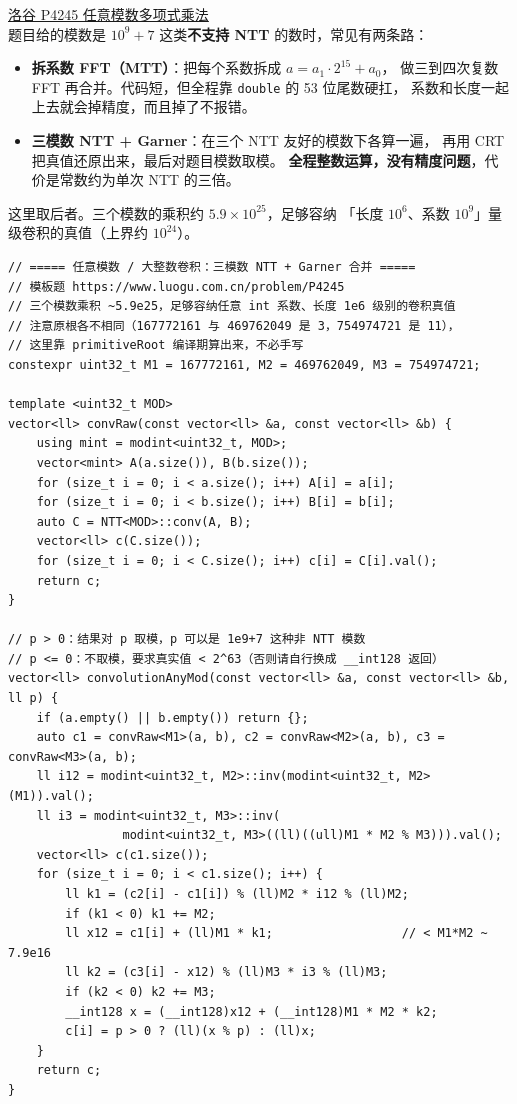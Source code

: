		\href{https://www.luogu.com.cn/problem/P4245}{洛谷 P4245 任意模数多项式乘法} \\

		题目给的模数是 $10^9+7$ 这类\textbf{不支持 NTT} 的数时，常见有两条路：

		\begin{itemize}
			\item \textbf{拆系数 FFT（MTT）}：把每个系数拆成 $a = a_1 \cdot 2^{15} + a_0$，
			      做三到四次复数 FFT 再合并。代码短，但全程靠 \texttt{double} 的 53 位尾数硬扛，
			      系数和长度一起上去就会掉精度，而且掉了不报错。
			\item \textbf{三模数 NTT + Garner}：在三个 NTT 友好的模数下各算一遍，
			      再用 CRT 把真值还原出来，最后对题目模数取模。
			      \textbf{全程整数运算，没有精度问题}，代价是常数约为单次 NTT 的三倍。
		\end{itemize}

		这里取后者。三个模数的乘积约 $5.9 \times 10^{25}$，足够容纳
		「长度 $10^6$、系数 $10^9$」量级卷积的真值（上界约 $10^{24}$）。

		\begin{verbatim}
// ===== 任意模数 / 大整数卷积：三模数 NTT + Garner 合并 =====
// 模板题 https://www.luogu.com.cn/problem/P4245
// 三个模数乘积 ~5.9e25，足够容纳任意 int 系数、长度 1e6 级别的卷积真值
// 注意原根各不相同（167772161 与 469762049 是 3，754974721 是 11），
// 这里靠 primitiveRoot 编译期算出来，不必手写
constexpr uint32_t M1 = 167772161, M2 = 469762049, M3 = 754974721;

template <uint32_t MOD>
vector<ll> convRaw(const vector<ll> &a, const vector<ll> &b) {
    using mint = modint<uint32_t, MOD>;
    vector<mint> A(a.size()), B(b.size());
    for (size_t i = 0; i < a.size(); i++) A[i] = a[i];
    for (size_t i = 0; i < b.size(); i++) B[i] = b[i];
    auto C = NTT<MOD>::conv(A, B);
    vector<ll> c(C.size());
    for (size_t i = 0; i < C.size(); i++) c[i] = C[i].val();
    return c;
}

// p > 0：结果对 p 取模，p 可以是 1e9+7 这种非 NTT 模数
// p <= 0：不取模，要求真实值 < 2^63（否则请自行换成 __int128 返回）
vector<ll> convolutionAnyMod(const vector<ll> &a, const vector<ll> &b, ll p) {
    if (a.empty() || b.empty()) return {};
    auto c1 = convRaw<M1>(a, b), c2 = convRaw<M2>(a, b), c3 = convRaw<M3>(a, b);
    ll i12 = modint<uint32_t, M2>::inv(modint<uint32_t, M2>(M1)).val();
    ll i3 = modint<uint32_t, M3>::inv(
                modint<uint32_t, M3>((ll)((ull)M1 * M2 % M3))).val();
    vector<ll> c(c1.size());
    for (size_t i = 0; i < c1.size(); i++) {
        ll k1 = (c2[i] - c1[i]) % (ll)M2 * i12 % (ll)M2;
        if (k1 < 0) k1 += M2;
        ll x12 = c1[i] + (ll)M1 * k1;                  // < M1*M2 ~ 7.9e16
        ll k2 = (c3[i] - x12) % (ll)M3 * i3 % (ll)M3;
        if (k2 < 0) k2 += M3;
        __int128 x = (__int128)x12 + (__int128)M1 * M2 * k2;
        c[i] = p > 0 ? (ll)(x % p) : (ll)x;
    }
    return c;
}
		\end{verbatim}

